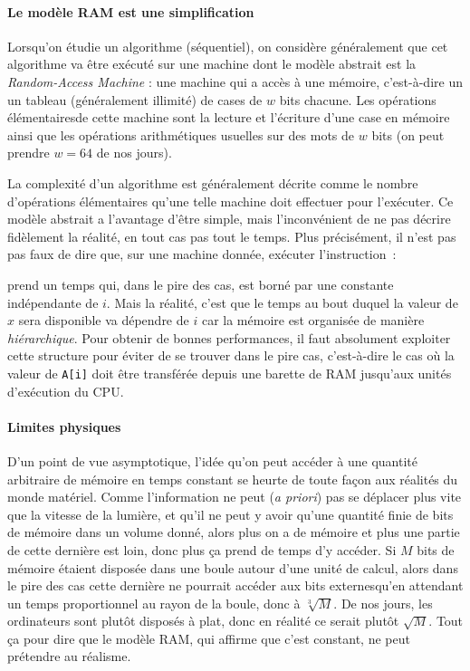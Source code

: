 \paragraph{Le modèle RAM est une simplification}Lorsqu'on étudie un algorithme
(séquentiel), on considère généralement que cet algorithme va être exécuté sur
une machine dont le modèle abstrait est la \textit{Random-Access Machine} : une
machine qui a accès à une mémoire, c'est-à-dire un un tableau (généralement
illimité) de cases de $w$ bits chacune. Les \og opérations élémentaires\fg de
cette machine sont la lecture et l'écriture d'une case en mémoire ainsi que les
opérations arithmétiques usuelles sur des mots de $w$ bits (on peut prendre
$w=64$ de nos jours).

La complexité d'un algorithme est généralement décrite comme le nombre
d'opérations élémentaires qu'une telle machine doit effectuer pour
l'exécuter. Ce modèle abstrait a l'avantage d'être simple, mais l'inconvénient
de ne pas décrire fidèlement la réalité, en tout cas pas tout le temps. Plus
précisément, il n'est pas pas faux de dire que, sur une machine donnée, exécuter
l'instruction~:


prend un temps qui, dans le pire des cas, est borné par une constante
indépendante de $i$. Mais la réalité, c'est que le temps au bout duquel la
valeur de $x$ sera disponible va dépendre de $i$ car la mémoire est organisée de
manière \emph{hiérarchique}. Pour obtenir de bonnes performances, il faut
absolument exploiter cette structure pour éviter de se trouver dans le pire cas,
c'est-à-dire le cas où la valeur de \texttt{A[i]} doit être transférée depuis
une barette de RAM jusqu'aux unités d'exécution du CPU.

\paragraph{Limites physiques} D'un point de vue asymptotique, l'idée qu'on peut
accéder à une quantité arbitraire de mémoire en temps constant se heurte de
toute façon aux réalités du monde matériel. Comme l'information ne peut
(\textit{a priori}) pas se déplacer plus vite que la vitesse de la lumière, et
qu'il ne peut y avoir qu'une quantité finie de bits de mémoire dans un volume
donné, alors plus on a de mémoire et plus une partie de cette dernière est \og
loin\fg, donc plus ça prend de temps d'y accéder. Si $M$ bits de mémoire étaient
disposée dans une boule autour d'une unité de calcul, alors dans le pire des cas
cette dernière ne pourrait accéder aux bits \og externes\fg qu'en attendant un
temps proportionnel au rayon de la boule, donc à $\sqrt[3]{M}$. De nos jours,
les ordinateurs sont plutôt disposés \og à plat\fg, donc en réalité ce serait
plutôt $\sqrt{M}$. Tout ça pour dire que le modèle RAM, qui affirme que c'est
constant, ne peut prétendre au réalisme.


